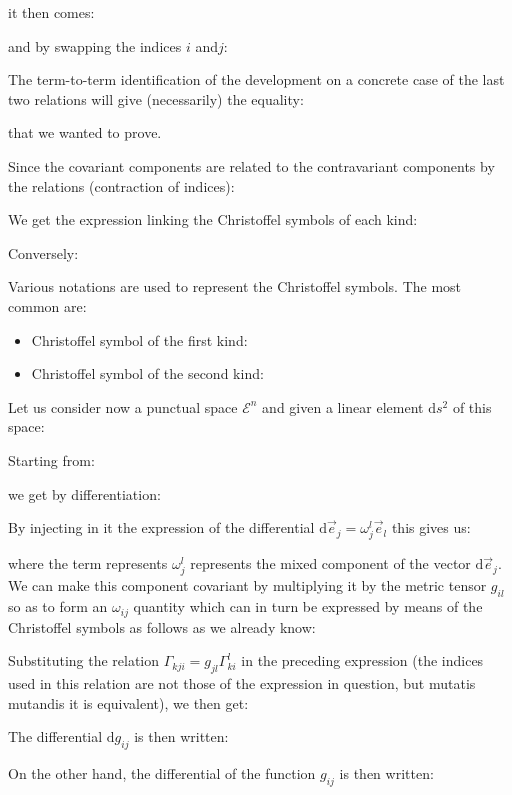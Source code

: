 	it then comes:
	
	and by swapping the indices $i$ and$ j$:
	
	The term-to-term identification of the development on a concrete case of the last two relations will give (necessarily) the equality:
	
	that we wanted to prove.

	Since the covariant components are related to the contravariant components by the relations (contraction of indices):
	
	We get the expression linking the Christoffel symbols of each kind:
	
	Conversely:
	
	\begin{tcolorbox}[title=Remark,colframe=black,arc=10pt]
	Various notations are used to represent the Christoffel symbols. The most common are:
	\begin{itemize}
		\item Christoffel symbol of the first kind:
		

		\item Christoffel symbol of the second kind:
		
	\end{itemize}
	\end{tcolorbox}
	Let us consider now a punctual space $\mathcal{E}^n$ and given a linear element $\mathrm{d}s^2$ of this space:
	
	Starting from:
	
	we get by differentiation:
	
	By injecting in it the expression of the differential $\mathrm{d}\vec{e}_j=\omega_j^l\vec{e}_l$ this gives us:
	
	where the term represents $\omega_j^l$ represents the mixed component of the vector $\mathrm{d}\vec{e}_j$. We can make this component covariant by multiplying it by the metric tensor $g_{il}$ so as to form an $\omega_{ij}$ quantity which can in turn be expressed by means of the Christoffel symbols as follows as we already know:
	
	Substituting the relation $\Gamma_{kji}=g_{jl}\Gamma_{ki}^l$ in the preceding expression (the indices used in this relation are not those of the expression in question, but mutatis mutandis it is equivalent), we then get:
	
	The differential $\mathrm{d}g_{ij}$ is then written:
	
	On the other hand, the differential of the function $g_{ij}$ is then written:
	
